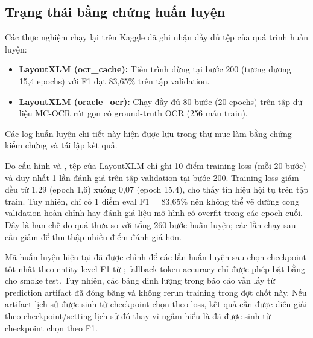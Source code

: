 \subsection{Trạng thái bằng chứng huấn luyện}
\label{subsec:training_evidence}

Các thực nghiệm chạy lại trên Kaggle đã ghi nhận đầy đủ tệp  của quá trình huấn luyện:
\begin{itemize}
  \item \textbf{LayoutXLM (ocr\_cache):} Tiến trình dừng tại bước 200 (tương đương 15,4 epochs) với F1 đạt 83,65\% trên tập validation.
  \item \textbf{LayoutXLM (oracle\_ocr):} Chạy đầy đủ 80 bước (20 epochs) trên tập dữ liệu MC-OCR rút gọn có ground-truth OCR (256 mẫu train).
\end{itemize}
Các log huấn luyện chi tiết này hiện được lưu trong thư mục  làm bằng chứng kiểm chứng và tái lập kết quả.

\begin{warnbox}
Do cấu hình  và , tệp  của LayoutXLM chỉ ghi 10 điểm training loss (mỗi 20 bước) và duy nhất 1 lần đánh giá trên tập validation tại bước 200. Training loss giảm đều từ 1,29 (epoch 1,6) xuống 0,07 (epoch 15,4), cho thấy tín hiệu hội tụ trên tập train. Tuy nhiên, chỉ có 1 điểm eval F1 = 83,65\% nên không thể vẽ đường cong validation hoàn chỉnh hay đánh giá liệu mô hình có overfit trong các epoch cuối. Đây là hạn chế do  quá thưa so với tổng 260 bước huấn luyện; các lần chạy sau cần giảm  để thu thập nhiều điểm đánh giá hơn.
\end{warnbox}

\begin{notebox}
Mã huấn luyện  hiện tại đã được chỉnh để các lần huấn luyện sau chọn checkpoint tốt nhất theo entity-level F1 từ ; fallback token-accuracy chỉ được phép bật bằng  cho smoke test. Tuy nhiên, các bảng định lượng trong báo cáo vẫn lấy từ prediction artifact đã đóng băng và không rerun training trong đợt chốt này. Nếu artifact lịch sử được sinh từ checkpoint chọn theo loss, kết quả cần được diễn giải theo checkpoint/setting lịch sử đó thay vì ngầm hiểu là đã được sinh từ checkpoint chọn theo F1.
\end{notebox}
